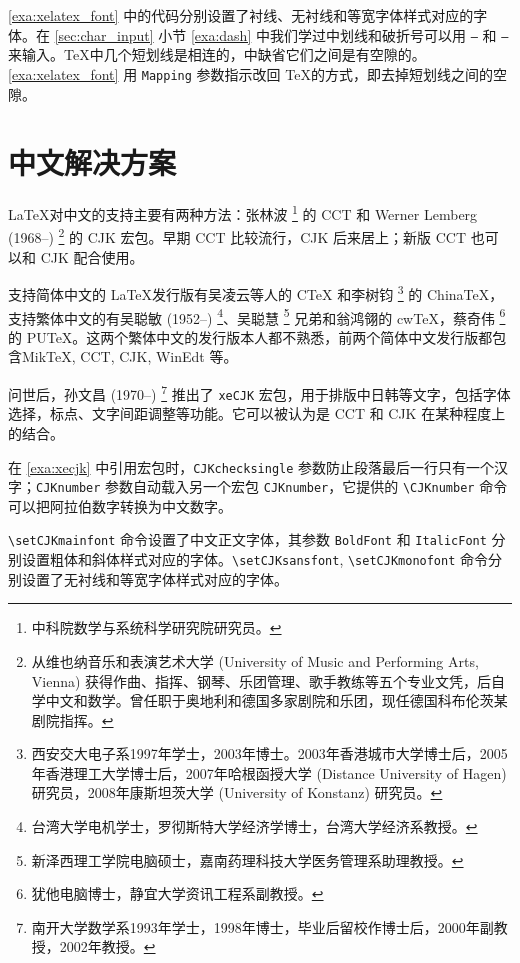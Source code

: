 \autoref{exa:xelatex_font} 中的代码分别设置了衬线、无衬线和等宽字体样式对应的字体。在 \ref{sec:char_input} 小节 \autoref{exa:dash} 中我们学过中划线和破折号可以用 \texttt{--} 和 \texttt{---} 来输入。\TeX 中几个短划线是相连的，\XeTeX 中缺省它们之间是有空隙的。\autoref{exa:xelatex_font} 用 \texttt{Mapping} 参数指示改回 \TeX 的方式，即去掉短划线之间的空隙。

\section{中文解决方案}

\LaTeX 对中文的支持主要有两种方法：张林波\indexZhangLinbo{} \footnote{中科院数学与系统科学研究院研究员。} 的 CCT 和 Werner Lemberg (1968--)\indexLemberg{} \footnote{从维也纳音乐和表演艺术大学 (University of Music and Performing Arts, Vienna) 获得作曲、指挥、钢琴、乐团管理、歌手教练等五个专业文凭，后自学中文和数学。曾任职于奥地利和德国多家剧院和乐团，现任德国科布伦茨某剧院指挥。} 的 CJK 宏包。早期 CCT 比较流行，CJK 后来居上；新版 CCT 也可以和 CJK 配合使用。

支持简体中文的 \LaTeX 发行版有吴凌云等人的 CTeX 和李树钧\indexLiShujun{} \footnote{西安交大电子系1997年学士，2003年博士。2003年香港城市大学博士后，2005年香港理工大学博士后，2007年哈根函授大学 (Distance University of Hagen) 研究员，2008年康斯坦茨大学 (University of Konstanz) 研究员。} 的 ChinaTeX，支持繁体中文的有吴聪敏 (1952--)\indexWuCongmin{} \footnote{台湾大学电机学士，罗彻斯特大学经济学博士，台湾大学经济系教授。}、吴聪慧\indexWuConghui{} \footnote{新泽西理工学院电脑硕士，嘉南药理科技大学医务管理系助理教授。} 兄弟和翁鸿翎\indexWongHongling 的 cwTeX，蔡奇伟\indexCaiQiwei{} \footnote{犹他电脑博士，静宜大学资讯工程系副教授。} 的 PUTeX。这两个繁体中文的发行版本人都不熟悉，前两个简体中文发行版都包含MikTeX, CCT, CJK, WinEdt 等。

\XeTeX 问世后，孙文昌 (1970--)\indexSunWenchang{} \footnote{南开大学数学系1993年学士，1998年博士，毕业后留校作博士后，2000年副教授，2002年教授。} 推出了 \texttt{xeCJK} 宏包，用于排版中日韩等文字，包括字体选择，标点、文字间距调整等功能。它可以被认为是 CCT 和 CJK 在某种程度上的结合。

在 \autoref{exa:xecjk} 中引用宏包时，\texttt{CJKchecksingle} 参数防止段落最后一行只有一个汉字；\texttt{CJKnumber} 参数自动载入另一个宏包 \texttt{CJKnumber}，它提供的 \verb|\CJKnumber| 命令可以把阿拉伯数字转换为中文数字。

\verb|\setCJKmainfont| 命令设置了中文正文字体，其参数 \texttt{BoldFont} 和 \texttt{ItalicFont} 分别设置粗体和斜体样式对应的字体。\verb|\setCJKsansfont|, \verb|\setCJKmonofont| 命令分别设置了无衬线和等宽字体样式对应的字体。

